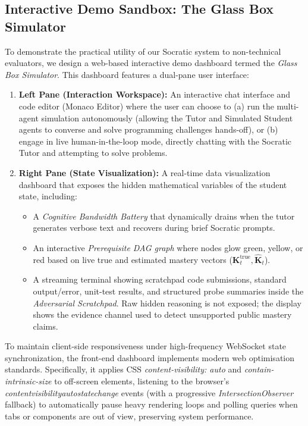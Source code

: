 \documentclass[11pt,a4paper]{report}
\begin{document}
\subsection{Interactive Demo Sandbox: The Glass Box Simulator}
To demonstrate the practical utility of our Socratic system to non-technical evaluators, we design a web-based interactive demo dashboard termed the \textit{Glass Box Simulator}. This dashboard features a dual-pane user interface:
\begin{enumerate}
    \item \textbf{Left Pane (Interaction Workspace):} An interactive chat interface and code editor (Monaco Editor) where the user can choose to (a) run the multi-agent simulation autonomously (allowing the Tutor and Simulated Student agents to converse and solve programming challenges hands-off), or (b) engage in live human-in-the-loop mode, directly chatting with the Socratic Tutor and attempting to solve problems.
    \item \textbf{Right Pane (State Visualization):} A real-time data visualization dashboard that exposes the hidden mathematical variables of the student state, including:
    \begin{itemize}
        \item A \textit{Cognitive Bandwidth Battery} that dynamically drains when the tutor generates verbose text and recovers during brief Socratic prompts.
        \item An interactive \textit{Prerequisite DAG graph} where nodes glow green, yellow, or red based on live true and estimated mastery vectors ($\mathbf{K}^{\text{true}}_t, \hat{\mathbf{K}}_t$).
        \item A streaming terminal showing scratchpad code submissions, standard output/error, unit-test results, and structured probe summaries inside the \textit{Adversarial Scratchpad}. Raw hidden reasoning is not exposed; the display shows the evidence channel used to detect unsupported public mastery claims.
    \end{itemize}
\end{enumerate}
To maintain client-side responsiveness under high-frequency WebSocket state synchronization, the front-end dashboard implements modern web optimisation standards. Specifically, it applies CSS \textit{content-visibility: auto} and \textit{contain-intrinsic-size} to off-screen elements, listening to the browser's \textit{contentvisibilityautostatechange} events (with a progressive \textit{IntersectionObserver} fallback) to automatically pause heavy rendering loops and polling queries when tabs or components are out of view, preserving system performance.
\end{document}
